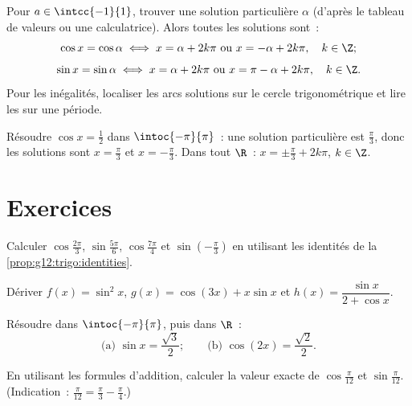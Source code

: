 \begin{method}[Résoudre $\cos x = a$ et $\sin x = a$]\label{met:g12:trigo:equations}
Pour $a \in \intcc{-1}{1}$, trouver une solution particulière $\alpha$
(d'après le tableau de valeurs ou une calculatrice). Alors toutes les
solutions sont~:
\[
\cos x = \cos\alpha \iff x = \alpha + 2k\pi \text{ ou } x = -\alpha + 2k\pi,
\quad k \in \Z;
\]
\[
\sin x = \sin\alpha \iff x = \alpha + 2k\pi \text{ ou } x = \pi - \alpha + 2k\pi,
\quad k \in \Z.
\]
Pour les inégalités, localiser les arcs solutions sur le cercle
trigonométrique et lire les  sur une période.
\end{method}

\begin{example}\label{ex:g12:trigo:equation}
Résoudre $\cos x = \frac12$ dans $\intoc{-\pi}{\pi}$~: une solution
particulière est $\frac\pi3$, donc les solutions sont $x = \frac\pi3$ et
$x = -\frac\pi3$. Dans tout $\R$~: $x = \pm\frac\pi3 + 2k\pi$,
$k \in \Z$.
\end{example}

\section{Exercices}

\begin{exercise}[$\star$]\label{exo:g12:trigo:1}
Calculer $\cos\frac{2\pi}{3}$, $\sin\frac{5\pi}{6}$, $\cos\frac{7\pi}{4}$
et $\sin\left(-\frac{\pi}{3}\right)$ en utilisant les identités de la
\cref{prop:g12:trigo:identities}.
\end{exercise}

\begin{exercise}[$\star$]\label{exo:g12:trigo:2}
Dériver $f(x) = \sin^2 x$, $g(x) = \cos(3x) + x\sin x$ et
$h(x) = \dfrac{\sin x}{2 + \cos x}$.
\end{exercise}

\begin{exercise}[$\star$]\label{exo:g12:trigo:3}
Résoudre dans $\intoc{-\pi}{\pi}$, puis dans $\R$~:
\[
\text{(a) } \sin x = \frac{\sqrt3}{2};
\qquad
\text{(b) } \cos\left(2x\right) = \frac{\sqrt2}{2} .
\]
\end{exercise}

\begin{exercise}[$\star\star$]\label{exo:g12:trigo:4}
En utilisant les formules d'addition, calculer la valeur exacte de
$\cos\frac{\pi}{12}$ et $\sin\frac{\pi}{12}$.
(Indication~: $\frac{\pi}{12} = \frac{\pi}{3} - \frac{\pi}{4}$.)
\end{exercise}

